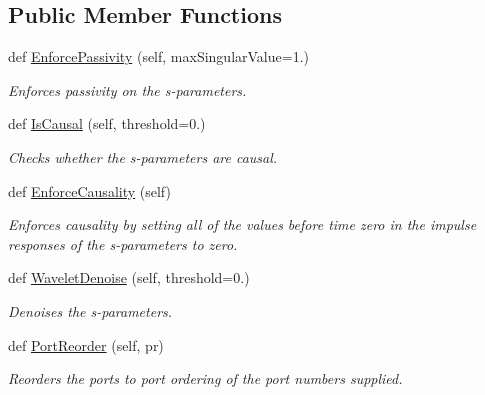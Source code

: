 \subsection*{Public Member Functions}
\begin{DoxyCompactItemize}
\item 
def \hyperlink{classSignalIntegrity_1_1SParameters_1_1SParameterManipulation_1_1SParameterManipulation_a39c856ddb77d77db3db1944a18fe6009}{Enforce\+Passivity} (self, max\+Singular\+Value=1.)
\begin{DoxyCompactList}\small\item\em Enforces passivity on the s-\/parameters. \end{DoxyCompactList}\item 
def \hyperlink{classSignalIntegrity_1_1SParameters_1_1SParameterManipulation_1_1SParameterManipulation_a4bb07518fdccfa71483dc4e98eb83083}{Is\+Causal} (self, threshold=0.)
\begin{DoxyCompactList}\small\item\em Checks whether the s-\/parameters are causal. \end{DoxyCompactList}\item 
def \hyperlink{classSignalIntegrity_1_1SParameters_1_1SParameterManipulation_1_1SParameterManipulation_ab0534e987c24d15ff3bcba7ef74ec1d1}{Enforce\+Causality} (self)
\begin{DoxyCompactList}\small\item\em Enforces causality by setting all of the values before time zero in the impulse responses of the s-\/parameters to zero. \end{DoxyCompactList}\item 
def \hyperlink{classSignalIntegrity_1_1SParameters_1_1SParameterManipulation_1_1SParameterManipulation_a537884def79fedd9611365a1de55471f}{Wavelet\+Denoise} (self, threshold=0.)
\begin{DoxyCompactList}\small\item\em Denoises the s-\/parameters. \end{DoxyCompactList}\item 
def \hyperlink{classSignalIntegrity_1_1SParameters_1_1SParameterManipulation_1_1SParameterManipulation_a979f42e9c8bf72ce90999a24da8a839d}{Port\+Reorder} (self, pr)
\begin{DoxyCompactList}\small\item\em Reorders the ports to port ordering of the port numbers supplied. \end{DoxyCompactList}\end{DoxyCompactItemize}


